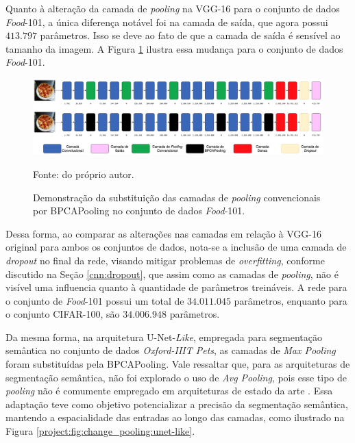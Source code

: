 Quanto à alteração da camada de \textit{pooling} na VGG-16 para o conjunto de dados \textit{Food}-101, a única diferença notável foi na camada de saída, que agora possui $413.797$ parâmetros. Isso se deve ao fato de que a camada de saída é sensível ao tamanho da imagem. A Figura \ref{project:fig:change_pooling:vgg-food} ilustra essa mudança para o conjunto de dados \textit{Food}-101.

\begin{figure}[H]
    \centering
    \caption{Demonstração da substituição das camadas de \textit{pooling} convencionais por BPCAPooling no conjunto de dados \textit{Food}-101.}
    \includegraphics[width=1\textwidth]{recursos/imagens/project/vgg-with-bpca-food.png}
    \label{project:fig:change_pooling:vgg-food}

    Fonte: do próprio autor.
\end{figure}

Dessa forma, ao comparar as alterações nas camadas em relação à VGG-16 original para ambos os conjuntos de dados, nota-se a inclusão de uma camada de \textit{dropout} no final da rede, visando mitigar problemas de \textit{overfitting}, conforme discutido na Seção \ref{cnn:dropout}, que assim como as camadas de \textit{pooling}, não é visível uma influencia quanto à quantidade de parâmetros treináveis. A rede para o conjunto de \textit{Food}-101 possui um total de $34.011.045$ parâmetros, enquanto para o conjunto CIFAR-100, são $34.006.948$ parâmetros.

Da mesma forma, na arquitetura U-Net-\textit{Like}, empregada para segmentação semântica no conjunto de dados \textit{Oxford-IIIT Pets}, as camadas de \textit{Max Pooling} foram substituídas pela BPCAPooling. Vale ressaltar que, para as arquiteturas de segmentação semântica, não foi explorado o uso de \textit{Avg Pooling}, pois esse tipo de \textit{pooling} não é comumente empregado em arquiteturas de estado da arte \citep{Ronneberger2015U-net:Segmentation,Kugelman2022ASegmentation}. Essa adaptação teve como objetivo potencializar a precisão da segmentação semântica, mantendo a espacialidade das entradas ao longo das camadas, como ilustrado na Figura \ref{project:fig:change_pooling:unet-like}.

